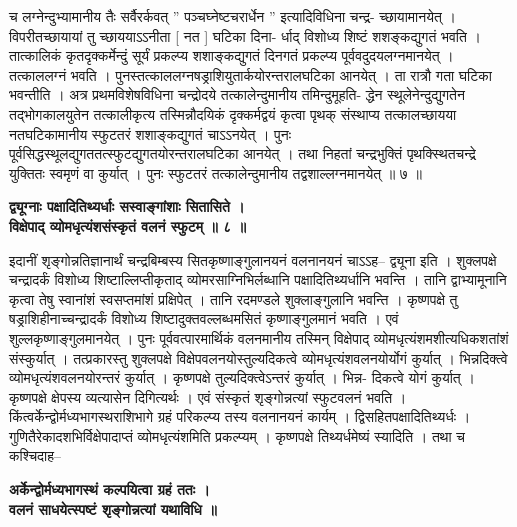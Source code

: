 \documentclass[11pt, openany]{book}
\begin{document}
{{{{\newpage
\thispagestyle{fancy}
\fancyhf{}
\lhead{[संकीर्णाधिकारः]}
\justifying
\noindent
च लग्नेन्दुभ्यामानीय तैः सर्वैरर्कवत् '' पञ्चघ्नेष्टचरार्धेन ''
इत्यादिविधिना चन्द्र-
च्छायामानयेत् । विपरीतच्छायायां तु च्छाययाऽऽनीता [ नत ] घटिका
दिना-
र्धाद् विशोध्य शिष्टं शशङ्कद्युगतं भवति । तात्कालिकं
कृतदृक्कर्मेन्दुं सूर्यं प्रकल्प्य 
शशाङ्कद्युगतं दिनगतं प्रकल्प्य पूर्ववदुदयलग्नमानयेत् । तत्काललग्नं
भवति । 
पुनस्तत्काललग्नषड्राशियुतार्कयोरन्तरालघटिका आनयेत् । ता रात्रौ गता
घटिका 
भवन्तीति । अत्र प्रथमविशेषविधिना चन्द्रोदये तत्कालेन्दुमानीय
तमिन्दुमूहति-
द्धेन स्थूलेनेन्दुद्युगतेन तद्भोगकालयुतेन तत्कालीकृत्य 
तस्मिन्नौदयिकं
दृक्कर्मद्वयं 
कृत्वा पृथक् संस्थाप्य तत्कालच्छायया नतघटिकामानीय स्फुटतरं शशाङ्कद्युगतं
चाऽऽनयेत् । पुनः पूर्वसिद्धस्थूलद्युगततत्स्फुटद्युगतयोरन्तरालघटिका
आनयेत् । 
तथा निहतां चन्द्रभुक्तिं पृथक्स्थितचन्द्रे युक्तितः स्वमृणं वा कुर्यात्
। पुनः 
स्फुटतरं तत्कालेन्दुमानीय तद्वशाल्लग्नमानयेत् ॥ ७ ॥

\vspace{2mm}
\centering
\textbf{
 द्व्यूग्नाः पक्षादितिथ्यर्धाः सस्वाङ्गांशाः सितासिते । \\
 विक्षेपाद् व्योमधृत्यंशसंस्कृतं वलनं स्फुटम् ॥ ८ ॥ }

\vspace{2mm}
\justifying
 इदानीं शृङ्गोन्नतिज्ञानार्थं चन्द्रबिम्बस्य सितकृष्णाङ्गुलानयनं
वलनानयनं 
चाऽऽह-- द्व्यूना इति । शुक्लपक्षे चन्द्रादर्कं विशोध्य
शिष्टाल्लिप्तीकृताद् व्योमरसाग्निभिर्लब्धानि
पक्षादितिथ्यर्धानि भवन्ति । तानि द्वाभ्यामूनानि
कृत्वा तेषु 
स्वानांशं स्वसप्तमांशं प्रक्षिपेत् । तानि रदमण्डले शुक्लाङ्गुलानि
भवन्ति । कृष्णपक्षे
तु षड्राशिहीनाच्चन्द्रादर्कं विशोध्य शिष्टादुक्तवल्लब्धमसितं
कृष्णाङ्गुलमानं 
भवति । एवं शुल्लकृष्णाङ्गुलमानयेत् । पुनः पूर्ववत्पारमार्थिकं
वलनमानीय 
तस्मिन् विक्षेपाद् व्योमधृत्यंशमशीत्यधिकशतांशं संस्कुर्यात् ।
तत्प्रकारस्तु शुक्लपक्षे
विक्षेपवलनयोस्तुल्यदिकत्वे व्योमधृत्यंशवलनयोर्योगं कुर्यात् ।
भिन्नदिक्त्वे 
व्योमधृत्यंशवलनयोरन्तरं कुर्यात् । कृष्णपक्षे तुल्यदिक्त्वेऽन्तरं
कुर्यात् । भिन्न-
दिकत्वे योगं कुर्यात् । कृष्णपक्षे क्षेपस्य व्यत्यासेन दिगित्यर्थः
। एवं संस्कृतं 
शृङ्गोन्नत्यां स्फुटवलनं भवति । किंत्वर्केन्द्वोर्मध्यभागस्थराशिभागे
ग्रहं परिकल्प्य
तस्य वलनानयनं कार्यम् । द्विसहितपक्षादितिथ्यर्धः ।
गुणितैरेकादशभिर्विक्षेपादाप्तं
व्योमधृत्यंशमिति प्रकल्प्यम् । कृष्णपक्षे
तिथ्यर्धमेष्यं स्यादिति । 
तथा च कश्चिदाह-- 

\vspace{2mm}
\centering
\textbf{
 अर्केन्द्वोर्मध्यभागस्थं कल्पयित्वा ग्रहं ततः । \\
 वलनं साधयेत्स्पष्टं शृङ्गोन्नत्यां यथाविधि ॥}

}}}}
\end{document}
